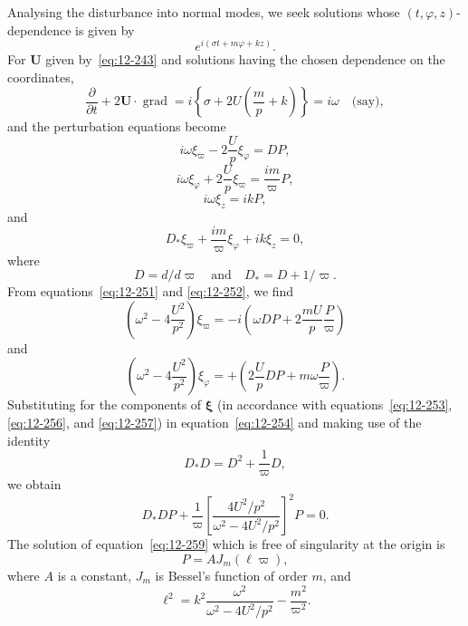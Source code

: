Analysing the disturbance into normal modes, we seek solutions whose $(t,\varphi,z)$-dependence is given by
\begin{equation}
\label{eq:12-249}
e^{i(\sigma t + m\varphi + kz)}.
\end{equation}
For $\mathbf{U}$ given by~\eqref{eq:12-243} and solutions having the chosen dependence on the coordinates,
\begin{equation}
\label{eq:12-250}
\frac{\partial}{\partial t} + 2\mathbf{U}\cdot\operatorname{grad} = i\left\{\sigma + 2U\left(\frac{m}{p} + k\right)\right\} = i\omega \quad \text{(say)},
\end{equation}
and the perturbation equations become
\begin{equation}
\label{eq:12-251}
i\omega\xi_\varpi - 2\frac{U}{p}\xi_\varphi = DP,
\end{equation}
\begin{equation}
\label{eq:12-252}
i\omega\xi_\varphi + 2\frac{U}{p}\xi_\varpi = \frac{im}{\varpi}P,
\end{equation}
\begin{equation}
\label{eq:12-253}
i\omega\xi_z = ikP,
\end{equation}
and
\begin{equation}
\label{eq:12-254}
D_*\xi_\varpi + \frac{im}{\varpi}\xi_\varphi + ik\xi_z = 0,
\end{equation}
where
\begin{equation}
\label{eq:12-255}
D = d/d\varpi \quad \text{and} \quad D_* = D + 1/\varpi.
\end{equation}
From equations~\eqref{eq:12-251} and \eqref{eq:12-252}, we find
\begin{equation}
\label{eq:12-256}
\left(\omega^2 - 4\frac{U^2}{p^2}\right)\xi_\varpi = -i\left(\omega DP + 2\frac{mU}{p}\frac{P}{\varpi}\right)
\end{equation}
and
\begin{equation}
\label{eq:12-257}
\left(\omega^2 - 4\frac{U^2}{p^2}\right)\xi_\varphi = +\left(2\frac{U}{p}DP + m\omega\frac{P}{\varpi}\right).
\end{equation}
Substituting for the components of $\boldsymbol\xi$ (in accordance with equations~\eqref{eq:12-253}, \eqref{eq:12-256}, and \eqref{eq:12-257}) in equation~\eqref{eq:12-254} and making use of the identity
\begin{equation}
\label{eq:12-258}
D_*D = D^2 + \frac{1}{\varpi}D,
\end{equation}
we obtain
\begin{equation}
\label{eq:12-259}
D_*DP + \frac{1}{\varpi}\left[\frac{4U^2/p^2}{\omega^2 - 4U^2/p^2}\right]^2 P = 0.
\end{equation}
The solution of equation~\eqref{eq:12-259} which is free of singularity at the origin is
\begin{equation}
\label{eq:12-260}
P = A J_m(\ell\varpi),
\end{equation}
where $A$ is a constant, $J_m$ is Bessel's function of order $m$, and
\begin{equation}
\label{eq:12-261}
\ell^2 = k^2\frac{\omega^2}{\omega^2 - 4U^2/p^2} - \frac{m^2}{\varpi^2}.
\end{equation}

